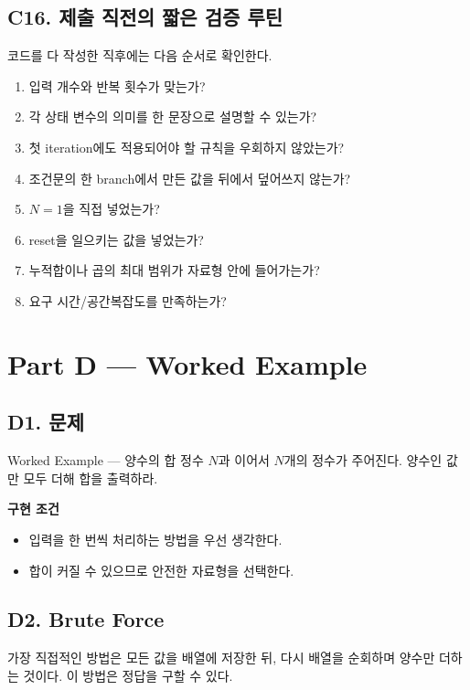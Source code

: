 \subsection{C16. 제출 직전의 짧은 검증 루틴}
코드를 다 작성한 직후에는 다음 순서로 확인한다.
\begin{enumerate}
  \item 입력 개수와 반복 횟수가 맞는가?
  \item 각 상태 변수의 의미를 한 문장으로 설명할 수 있는가?
  \item 첫 iteration에도 적용되어야 할 규칙을 우회하지 않았는가?
  \item 조건문의 한 branch에서 만든 값을 뒤에서 덮어쓰지 않는가?
  \item $N=1$을 직접 넣었는가?
  \item reset을 일으키는 값을 넣었는가?
  \item 누적합이나 곱의 최대 범위가 자료형 안에 들어가는가?
  \item 요구 시간/공간복잡도를 만족하는가?
\end{enumerate}

\section{Part D --- Worked Example}

\subsection*{D1. 문제}
\begin{problembox}{Worked Example --- 양수의 합}
정수 $N$과 이어서 $N$개의 정수가 주어진다. 양수인 값만 모두 더해 합을 출력하라.

\textbf{구현 조건}
\begin{itemize}
  \item 입력을 한 번씩 처리하는 방법을 우선 생각한다.
  \item 합이 커질 수 있으므로 안전한 자료형을 선택한다.
\end{itemize}
\end{problembox}

\subsection*{D2. Brute Force}
가장 직접적인 방법은 모든 값을 배열에 저장한 뒤, 다시 배열을 순회하며 양수만 더하는 것이다. 이 방법은 정답을 구할 수 있다.

